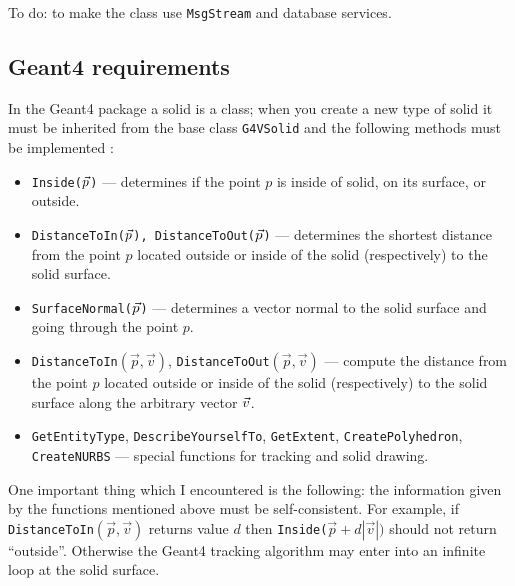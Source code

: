 \documentclass{article}
\begin{document}
To do: to make the class use {\tt MsgStream} and database services.

\subsection{Geant4 requirements}
In the Geant4 package a solid is a class; when you create a new type of solid
it must be inherited from the base class {\tt G4VSolid} and the following
methods must be implemented \cite{G4VSolid}:
\begin{itemize}
\item {\tt Inside($\vec{p}\/$)} --- determines if the point $p$ 
is inside of solid, on its surface, or outside.
\item {\tt DistanceToIn($\vec{p}\/$), DistanceToOut($\vec{p}\/$)} 
--- determines the shortest distance from the point $p$ 
located outside or inside of the solid (respectively) to the solid surface.
\item {\tt SurfaceNormal($\vec{p}\/$)} --- 
determines a vector normal to the solid surface and going through the point
$p$. 
\item {\tt DistanceToIn$(\vec{p}, \vec{v})$}, 
{\tt DistanceToOut$(\vec{p}, \vec{v})$} --- compute the distance
from the point $p$ located outside or inside of the solid (respectively)
to the solid surface along the arbitrary vector $\vec{v}\/$.
\item {\tt GetEntityType}, {\tt DescribeYourselfTo}, {\tt GetExtent},
{\tt CreatePolyhedron}, 
{\tt CreateNURBS} --- special functions for tracking and solid drawing.
\end{itemize}

One important thing which I encountered is the following: the information
given by the functions mentioned above must be self-consistent. For
example, if {\tt DistanceToIn$(\vec{p}, \vec{v})$} returns value $d$ then
{\tt Inside($\vec{p} + d |\vec{v}|)$} should not return ``outside''. Otherwise
the Geant4 tracking algorithm may enter into an infinite loop at the solid
surface.
\end{document}
